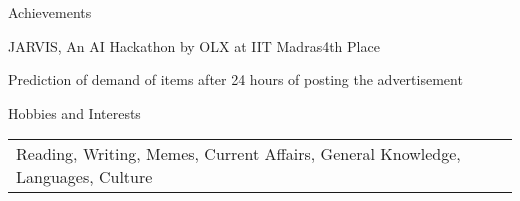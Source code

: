 \documentclass{resume} %
\begin{document}
\begin{rSection}{Achievements}
	
	\begin{rSubsection}{JARVIS, An AI Hackathon by OLX at IIT Madras}{}{4th Place}{}
		\item Prediction of demand of items after 24 hours of posting the advertisement
		
		
	\end{rSubsection}
			
	
	
\end{rSection}

\begin{rSection}{Hobbies and Interests}
	
	\begin{tabular}{ @{} >{}l @{} l }
		Reading, Writing, Memes, Current Affairs, General Knowledge, Languages, Culture
		
	\end{tabular}
	
	
	
	
\end{rSection}
\fi




\end{document}
